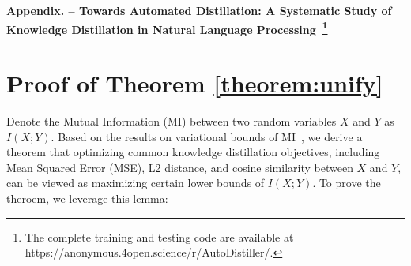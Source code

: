 \documentclass[11pt]{article}
\begin{document}



% 
\clearpage


\newpage
\appendix
\begin{center}
{\Large \textbf{Appendix. -- Towards Automated Distillation: A Systematic Study of Knowledge Distillation in Natural Language Processing~\footnote{The complete training and testing code are available at https://anonymous.4open.science/r/AutoDistiller/.}}}    
\end{center}
\section{Proof of Theorem \ref{theorem:unify}}
\setcounter{theorem}{0}
\renewcommand{\theequation}{A.\arabic{theorem}}
\label{sec:appdx:proof}
\noindent Denote the Mutual Information (MI) between two random variables $X$ and $Y$ as $I(X; Y)$. Based on the results on variational bounds of MI~\citep{poole2019variational}, we derive a theorem that optimizing common knowledge distillation objectives, including Mean Squared Error (MSE), L2 distance, and cosine similarity between $X$ and $Y$, can be viewed as maximizing certain lower bounds of $I(X; Y)$. To prove the theroem, we leverage this lemma:
\end{document}
